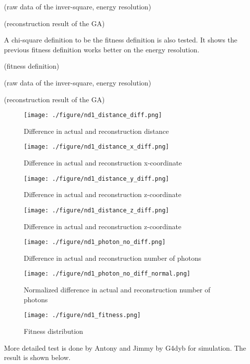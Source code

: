 (raw data of the inver-square, energy resolution)




(reconstruction result of the GA)


A chi-square definition to be the fitness definition is also tested.
It shows the previous fitness definition works better on the
energy resolution.


(fitness definition)




(raw data of the inver-square, energy resolution)




(reconstruction result of the GA)



\begin{figure}
    \centering
    \texttt{[image: ./figure/nd1\_distance\_diff.png]}
    \caption{Difference in actual and reconstruction distance}
    \label{fig:nd1_distance_diff.png}
    \end{figure}


\begin{figure}
    \centering
    \texttt{[image: ./figure/nd1\_distance\_x\_diff.png]}
    \caption{Difference in actual and reconstruction x-coordinate}
    \label{fig:nd1_distance_x_diff.png}
    \end{figure}


\begin{figure}
    \centering
    \texttt{[image: ./figure/nd1\_distance\_y\_diff.png]}
    \caption{Difference in actual and reconstruction z-coordinate}
    \label{fig:nd1_distance_y_diff.png}
    \end{figure}


\begin{figure}
    \centering
    \texttt{[image: ./figure/nd1\_distance\_z\_diff.png]}
    \caption{Difference in actual and reconstruction z-coordinate}
    \label{fig:nd1_distance_z_diff.png}
    \end{figure}


\begin{figure}
    \centering
    \texttt{[image: ./figure/nd1\_photon\_no\_diff.png]}
    \caption{Difference in actual and reconstruction number of photons}
    \label{fig:nd1_photon_no_diff.png}
    \end{figure}


\begin{figure}
    \centering
    \texttt{[image: ./figure/nd1\_photon\_no\_diff\_normal.png]}
    \caption{Normalized difference in actual and reconstruction number of photons}
    \label{fig:nd1_photon_no_diff_normal.png}
    \end{figure}


\begin{figure}
    \centering
    \texttt{[image: ./figure/nd1\_fitness.png]}
    \caption{Fitness distribution}
    \label{fig:nd1_fitness.png}
    \end{figure}



More detailed test is done by Antony and Jimmy by G4dyb for simulation.
The result is shown below.




